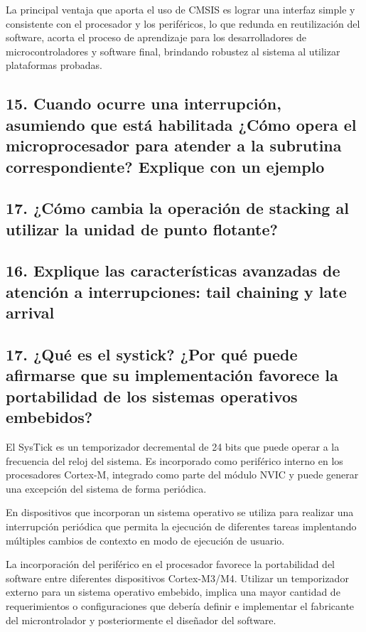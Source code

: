 \documentclass[10pt,a4paper,twoside,spanish]{article}	%
\begin{document}
La principal ventaja que aporta el uso de CMSIS es lograr una interfaz simple y consistente con el procesador y los periféricos, lo que redunda en  reutilización del software, acorta el proceso de aprendizaje para los desarrolladores de microcontroladores y software final, brindando robustez al sistema al utilizar plataformas probadas. 

\subsection*{15. Cuando ocurre una interrupción, asumiendo que está habilitada ¿Cómo opera el microprocesador para atender a la subrutina correspondiente? Explique con un ejemplo}

\subsection*{17. ¿Cómo cambia la operación de stacking al utilizar la unidad de punto flotante?}

\subsection*{16. Explique las características avanzadas de atención a interrupciones: tail chaining y late arrival}

\subsection*{17. ¿Qué es el systick? ¿Por qué puede afirmarse que su implementación favorece la portabilidad de los sistemas operativos embebidos?}

El SysTick es un temporizador decremental de 24 bits que puede operar a la frecuencia del reloj del sistema. Es incorporado como periférico interno en los procesadores Cortex-M, integrado como parte del módulo NVIC y puede generar una excepción del sistema de forma periódica.

En dispositivos que incorporan un sistema operativo se utiliza para realizar una interrupción periódica que permita la ejecución de diferentes tareas implentando múltiples cambios de contexto en modo de ejecución de usuario. 

La incorporación del periférico en el procesador favorece la portabilidad del software entre diferentes dispositivos Cortex-M3/M4. Utilizar un temporizador externo para un sistema operativo embebido, implica una mayor cantidad de requerimientos o configuraciones que debería definir e implementar el fabricante del microntrolador y posteriormente el diseñador del software.  
\end{document}

